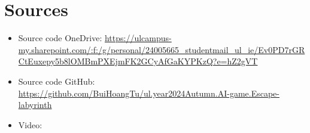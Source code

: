 \documentclass[a4paper,12pt]{article}
\begin{document}
\section*{Sources}
\begin{itemize}
    \item Source code OneDrive: \url{https://ulcampus-my.sharepoint.com/:f:/g/personal/24005665_studentmail_ul_ie/Ev0PD7rGRCtEuxepy5b8lOMBmPXEjmFK2GCyAfGaKYPKzQ?e=hZ2gVT}
    \item Source code GitHub: \url{https://github.com/BuiHoangTu/ul.year2024Autumn.AI-game.Escape-labyrinth}
    \item Video: 
\end{itemize}


\printbibliography
\end{document}
